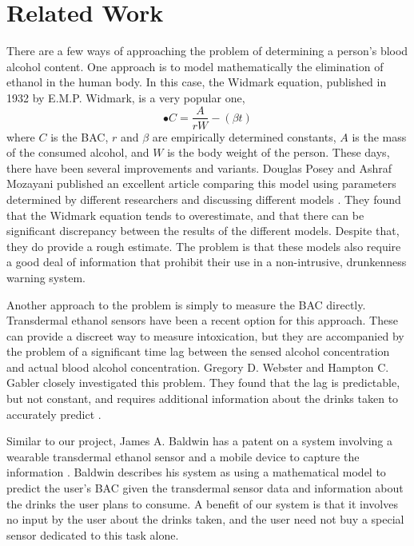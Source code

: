\section{Related Work}
There are a few ways of approaching the problem of determining a person's blood alcohol content. One approach is to model mathematically the elimination of ethanol in the human body. In this case, the Widmark equation, published in 1932 by E.M.P. Widmark, is a very popular one, \begin{equation}
•C=\frac{A}{rW}-(\beta t)
\end{equation} where $C$ is the BAC, $r$ and $\beta$ are empirically determined constants, $A$ is the mass of the consumed alcohol, and $W$ is the body weight of the person.
	These days, there have been several improvements and variants. Douglas Posey and Ashraf Mozayani published an excellent article comparing this model using parameters determined by different researchers and discussing different models \cite{Posey:2007}. They found that the Widmark equation tends to overestimate, and that there can be significant discrepancy between the results of the different models. Despite that, they do provide a rough estimate. The problem is that these models also require a good deal of information that prohibit their use in a non-intrusive, drunkenness warning system.

Another approach to the problem is simply to measure the BAC directly. Transdermal ethanol sensors have been a recent option for this approach. These can provide a discreet way to measure intoxication, but they are accompanied by the problem of a significant time lag between the sensed alcohol concentration and actual blood alcohol concentration. Gregory D. Webster and Hampton C. Gabler closely investigated this problem. They found that the lag is predictable, but not constant, and requires additional information about the drinks taken to accurately predict \cite{Webster:2007}.

Similar to our project, James A. Baldwin has a patent on a system involving a wearable transdermal ethanol sensor and a mobile device to capture the information \cite{Baldwin:2014}. Baldwin describes his system as using a mathematical model to predict the user's BAC given the transdermal sensor data and information about the drinks the user plans to consume. A benefit of our system is that it involves no input by the user about the drinks taken, and the user need not buy a special sensor dedicated to this task alone.

